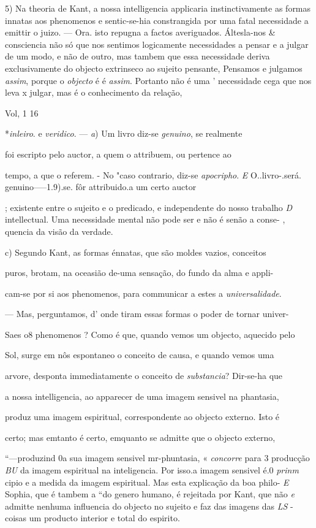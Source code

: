5) Na theoria de Kant, a nossa intelligencia applicaria instinctivamente as formas innatas aos phenomenos e sentic-se-hia constrangida por uma fatal necessidade a emittir o juizo. --- Ora. isto repugna a factos averiguados. Áltesla-nos \& consciencia não só que nos sentimos logicamente necessidades a pensar e a julgar de um modo, e não de outro, mas tambem que essa necessidade deriva exclusivamente do objecto extrinseco ao sujeito pensante, Pensamos e julgamos \emph{assim}, porque o \emph{objecto} é é \emph{assim}. Portanto não é uma ' necessidade cega que nos leva x julgar, mas é o conhecimento da relação,

Vol, 1 16

*\emph{inleiro}. e \emph{veridico}. --- \emph{a}) Um livro diz-se \emph{genuino}, se realmente

foi escripto pelo auctor, a quem o attribuem, ou pertence ao

tempo, a que o referem. - No "caso contrario, diz-se \emph{apocripho}. \emph{E} O..livro-.será. genuino-----1.9).se. fôr attribuido.a um certo auctor

; existente entre o sujeito e o predicado, e independente do nosso trabalho \emph{D} intellectual. Uma necessidade mental não pode ser e não é senão a conse- , quencia da visão da verdade.

c) Segundo Kant, as formas énnatas, que são moldes vazios, conceitos

puros, brotam, na oceasião de-uma sensação, do fundo da alma e appli-

cam-se por si aos phenomenos, para communicar a estes a \emph{universalidade}.

--- Mas, perguntamos, d' onde tiram essas formas o poder de tornar univer-

Saes o8 phenomenos ? Como é que, quando vemos um objecto, aquecido pelo

Sol, surge em nôs espontaneo o conceito de causa, e quando vemos uma

arvore, desponta immediatamente o conceito de \emph{substancia}? Dir-se-ha que

a nossa intelligencia, ao apparecer de uma imagem sensivel na phantasia,

produz uma imagem espiritual, correspondente ao objecto externo. Isto é

certo; mas emtanto é certo, emquanto se admitte que o objecto externo,

“---produzind 0a sua imagem sensivel mr-phuntasia, « \emph{concorre} para 3 producção \emph{BU} da imagem espiritual na inteligencia. Por isso.a imagem sensivel é.0 \emph{prinm} cipio e a medida da imagem espiritual. Mas esta explicação da boa philo- \emph{E} Sophia, que é tambem a “do genero humano, é rejeitada por Kant, que não \emph{e} admitte nenhuma influencia do objecto no sujeito e faz das imagens das \emph{LS} - coisas um producto interior e total do espirito.

